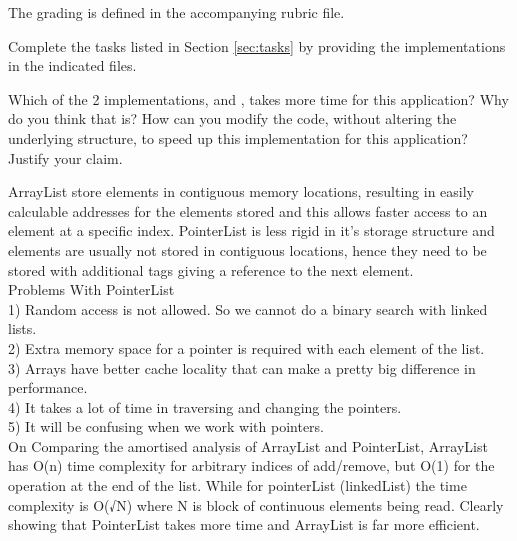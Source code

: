 \documentclass[addpoints]{exam}
\begin{document}
  The grading is defined in the accompanying rubric file.
  \begin{questions}
   Complete the tasks listed in Section \ref{sec:tasks} by providing the implementations in the indicated files.
    
   Which of the 2 implementations,  and , takes more time for this application? Why do you think that is? How can you modify the code, without altering the underlying structure, to speed up this implementation for this application? Justify your claim.
    \begin{solution}
      ArrayList store elements in contiguous memory locations, resulting in easily calculable addresses for the elements stored and this allows faster access to an element at a specific index. PointerList is less rigid in it's storage structure and elements are usually not stored in contiguous locations, hence they need to be stored with additional tags giving a reference to the next element.\\
Problems With PointerList\\
1) Random access is not allowed. So we cannot do a binary search with linked lists. \\
2) Extra memory space for a pointer is required with each element of the list. \\
3) Arrays have better cache locality that can make a pretty big difference in performance.\\
4) It takes a lot of time in traversing and changing the pointers.\\
5)  It will be confusing when we work with pointers.\\
On Comparing the amortised analysis of ArrayList and PointerList, ArrayList has O(n) time complexity for arbitrary indices of add/remove, but O(1) for the operation at the end of the list. While for pointerList (linkedList) the time complexity is O(√N) where N is block of continuous elements being read. Clearly showing that PointerList takes more time and ArrayList is far more efficient.


\end{solution}
\end{questions}
\end{document}
